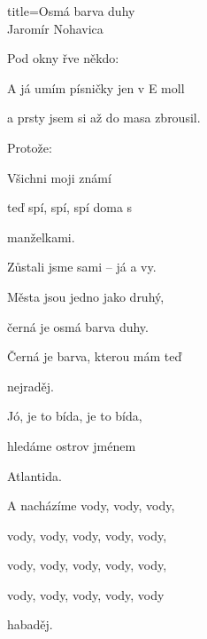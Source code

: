 \begin{song}{title=\predtitle\centering Osmá barva duhy \\\large Jaromír Nohavica  \vspace*{-0.3cm}}
\begin{centerjustified}
\begin{varwidth}[t]{0.48\textwidth}


\sloka
	Pod okny řve někdo: 
	
	A já umím písničky jen v E moll
	
	a prsty jsem si až do masa zbrousil.
	
	Protože:
	

	Všichni moji známí
	
	teď spí, spí, spí doma s 

	manželkami.

	Zůstali jsme sami -- já a vy.
	
	Města jsou jedno jako druhý,
	
	černá je osmá barva duhy.
	
	Černá je barva, kterou mám teď 

	nejraděj.
	
	Jó, je to bída, je to bída,
	
	hledáme ostrov jménem 

	Atlantida.
	
	A nacházíme vody, vody, vody, 

	vody, vody, vody, vody, vody, 
	
	vody, vody, vody, vody, vody,

	vody, vody, vody, vody, vody

	habaděj. 

\end{varwidth}

\end{centerjustified}
\setcounter{Slokočet}{0}
\end{song}

